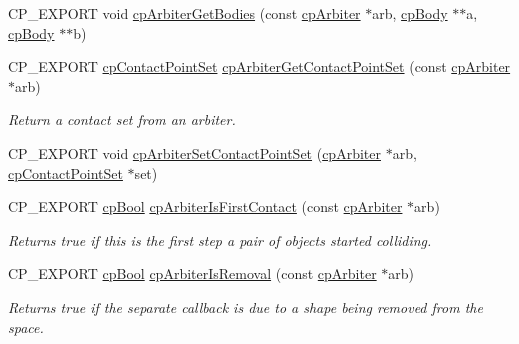 \begin{DoxyCompactItemize}
\item 
C\+P\+\_\+\+E\+X\+P\+O\+RT void \hyperlink{group__cpArbiter_gac5371d101c55a8a9c5b471e12010a8b3}{cp\+Arbiter\+Get\+Bodies} (const \hyperlink{structcpArbiter}{cp\+Arbiter} $\ast$arb, \hyperlink{structcpBody}{cp\+Body} $\ast$$\ast$a, \hyperlink{structcpBody}{cp\+Body} $\ast$$\ast$b)
\item 
\mbox{\label{group__cpArbiter_ga3bd7be89287b9955f650f3d9a01eae40}} 
C\+P\+\_\+\+E\+X\+P\+O\+RT \hyperlink{structcpContactPointSet}{cp\+Contact\+Point\+Set} \hyperlink{group__cpArbiter_ga3bd7be89287b9955f650f3d9a01eae40}{cp\+Arbiter\+Get\+Contact\+Point\+Set} (const \hyperlink{structcpArbiter}{cp\+Arbiter} $\ast$arb)
\begin{DoxyCompactList}\small\item\em Return a contact set from an arbiter. \end{DoxyCompactList}\item 
C\+P\+\_\+\+E\+X\+P\+O\+RT void \hyperlink{group__cpArbiter_ga2a68f589f58dbae29de18cebee3de02d}{cp\+Arbiter\+Set\+Contact\+Point\+Set} (\hyperlink{structcpArbiter}{cp\+Arbiter} $\ast$arb, \hyperlink{structcpContactPointSet}{cp\+Contact\+Point\+Set} $\ast$set)
\item 
\mbox{\label{group__cpArbiter_gabd696398cfa9cfea7a9050119b4c9c4b}} 
C\+P\+\_\+\+E\+X\+P\+O\+RT \hyperlink{group__basicTypes_gabc5e752c48f3449ca26ef413ecbd647e}{cp\+Bool} \hyperlink{group__cpArbiter_gabd696398cfa9cfea7a9050119b4c9c4b}{cp\+Arbiter\+Is\+First\+Contact} (const \hyperlink{structcpArbiter}{cp\+Arbiter} $\ast$arb)
\begin{DoxyCompactList}\small\item\em Returns true if this is the first step a pair of objects started colliding. \end{DoxyCompactList}\item 
\mbox{\label{group__cpArbiter_gab8e123894234c06d2aa1b06072803d99}} 
C\+P\+\_\+\+E\+X\+P\+O\+RT \hyperlink{group__basicTypes_gabc5e752c48f3449ca26ef413ecbd647e}{cp\+Bool} \hyperlink{group__cpArbiter_gab8e123894234c06d2aa1b06072803d99}{cp\+Arbiter\+Is\+Removal} (const \hyperlink{structcpArbiter}{cp\+Arbiter} $\ast$arb)
\begin{DoxyCompactList}\small\item\em Returns true if the separate callback is due to a shape being removed from the space. \end{DoxyCompactList}\item 

\end{DoxyCompactItemize}
